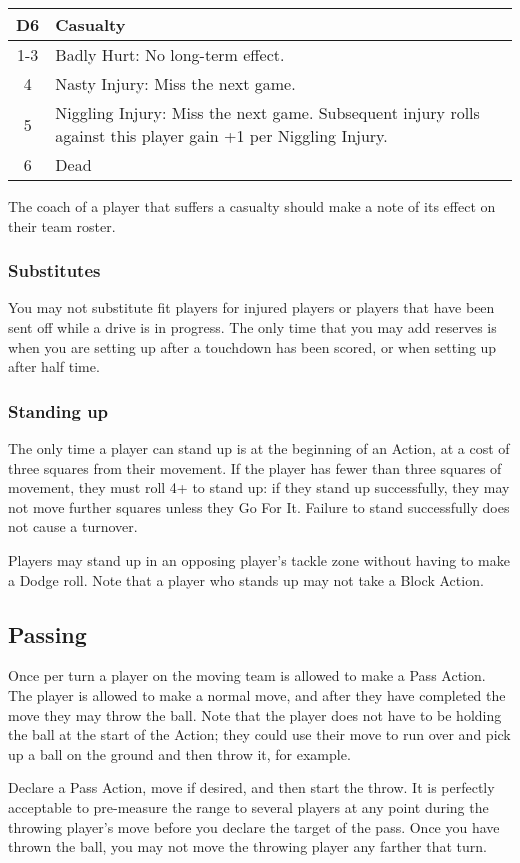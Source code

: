 \begin{multicols}{2}
\medskip
\begin{tabularx}{\linewidth}{ | c | X | }
\hline
\textbf{D6} & \textbf{Casualty} \\
\hline
1-3 & Badly Hurt: No long-term effect. \\
\hline
4 & Nasty Injury: Miss the next game. \\
\hline
5 & Niggling Injury: Miss the next game. Subsequent injury rolls against this player gain +1 per Niggling Injury. \\
\hline
6 & Dead \\
\hline
\end{tabularx}
\medskip

\par The coach of a player that suffers a casualty should make a note of its effect on their team roster.

\subsubsection{Substitutes}
\par You may not substitute fit players for injured players or players that have been sent off while a drive is in progress. The only time that you may add reserves is when you are setting up after a touchdown has been scored, or when setting up after half time.

\subsubsection{Standing up}
\par The only time a player can stand up is at the beginning of an Action, at a cost of three squares from their movement. If the player has fewer than three squares of movement, they must roll 4+ to stand up: if they stand up successfully, they may not move further squares unless they Go For It. Failure to stand successfully does not cause a turnover.
\par Players may stand up in an opposing player's tackle zone without having to make a Dodge roll. Note that a player who stands up may not take a Block Action.

\subsection{Passing}
\par Once per turn a player on the moving team is allowed to make a Pass Action. The player is allowed to make a normal move, and after they have completed the move they may throw the ball. Note that the player does not have to be holding the ball at the start of the Action; they could use their move to run over and pick up a ball on the ground and then throw it, for example.
\par Declare a Pass Action, move if desired, and then start the throw. It is perfectly acceptable to pre-measure the range to several players at any point during the throwing player's move before you declare the target of the pass. Once you have thrown the ball, you may not move the throwing player any farther that turn.


\end{multicols}
